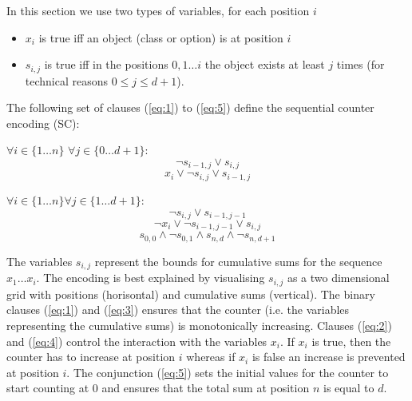 \documentclass[]{llncs}
\begin{document}
In this section we use two types of variables, for each position $i$

\begin{itemize}
    \item  $x_i$ is true iff an object (class or option) is at position $i$
    \item  $s_{i,j}$ is true iff in the positions $0,1 \ldots i$ the object exists at least $j$ times (for technical
        reasons $0 \leq j \leq d+1$). 
\end{itemize} 

The following set of clauses (\ref{eq:1}) to (\ref{eq:5}) define the sequential counter encoding (SC):

$\forall i \in \{1\ldots n\}$ $\forall j \in\{0 \ldots d+1\}$: 
\begin{equation} \label{eq:1}
    \neg s_{i-1,j} \vee s_{i,j}
\end{equation}
\begin{equation} \label{eq:2}
    x_{i} \vee \neg s_{i,j} \vee s_{i-1,j}
\end{equation}

$\forall {i \in \{1\ldots n\}} \forall {j\in \{1\ldots d+1\}}$: 
\begin{equation} \label{eq:3}
    \neg s_{i,j} \vee s_{i-1,j-1}
\end{equation}
\begin{equation} \label{eq:4}
    \neg x_{i} \vee \neg s_{i-1,j-1} \vee s_{i,j}
\end{equation}
\begin{equation} \label{eq:5}
     s_{0,0} \wedge \neg s_{0,1} \wedge s_{n,d} \wedge \neg s_{n,d+1}
\end{equation}


The variables $s_{i,j}$  represent the bounds for cumulative sums for the sequence $x_1 \ldots x_i$. The encoding is
best explained by visualising $s_{i,j}$ as a two dimensional grid with positions (horisontal) and cumulative sums
(vertical). The binary clauses (\ref{eq:1}) and (\ref{eq:3}) ensures that the counter (i.e. the variables representing
the cumulative sums) is monotonically increasing. Clauses (\ref{eq:2}) and (\ref{eq:4}) control the interaction with the
variables $x_i$. If $x_i$ is true, then the counter has to increase at position $i$ whereas if $x_i$ is false an
increase is prevented at position $i$. The conjunction (\ref{eq:5}) sets the initial values for the counter to start
counting at 0 and ensures that the total sum at position $n$ is equal to $d$. 
\end{document}
